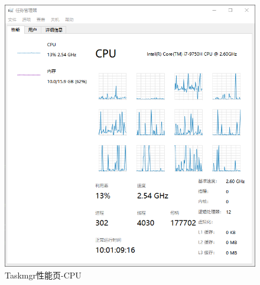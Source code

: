 \documentclass{beamer}
\begin{document}
\begin{frame}
    
\begin{figure}
    \centering
    \includegraphics[scale=0.4]{../media/comparison/mgr perftab cpu.png}
    \caption{Taskmgr性能页-CPU}
    \label{fig:mgrcpu}
\end{figure}
\end{frame}
\end{document}
